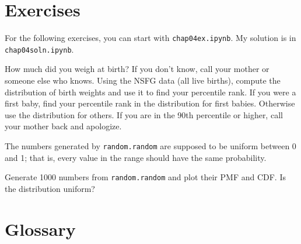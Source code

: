 \section{Exercises}

For the following exercises, you can start with \verb"chap04ex.ipynb".
My solution is in \verb"chap04soln.ipynb".

\begin{exercise}
How much did you weigh at birth?  If you don't know, call your mother
or someone else who knows.  Using the NSFG data (all live births),
compute the distribution of birth weights and use it to find your
percentile rank.  If you were a first baby, find your percentile rank
in the distribution for first babies.  Otherwise use the distribution
for others.  If you are in the 90th percentile or higher, call your
mother back and apologize.

\end{exercise}

\begin{exercise}
The numbers generated by {\tt random.random} are supposed to be
uniform between 0 and 1; that is, every value in the range
should have the same probability.

Generate 1000 numbers from {\tt random.random} and plot their
PMF and CDF.  Is the distribution uniform?

\end{exercise}


\section{Glossary}

